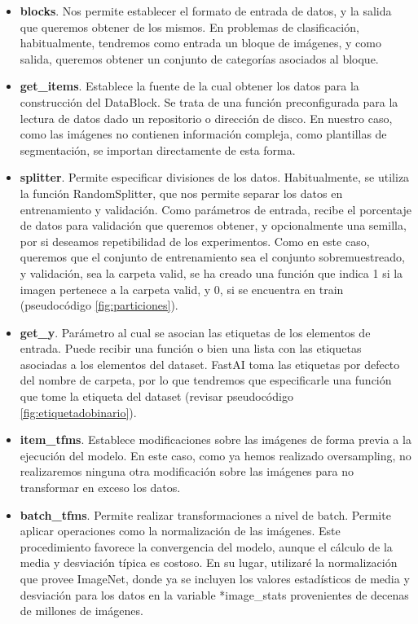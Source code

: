 \begin{itemize}
	\item \textbf{blocks}. Nos permite establecer el formato de entrada de datos, y la salida que queremos obtener de los mismos. En problemas de clasificación, habitualmente, tendremos como entrada un bloque de imágenes, y como salida, queremos obtener un conjunto de categorías asociados al bloque.
	\item \textbf{get\_items}. Establece la fuente de la cual obtener los datos para la construcción del DataBlock. Se trata de una función preconfigurada para la lectura de datos dado un repositorio o dirección de disco. En nuestro caso, como las imágenes no contienen información compleja, como plantillas de segmentación, se importan directamente de esta forma.
	\item \textbf{splitter}. Permite especificar divisiones de los datos. Habitualmente, se utiliza la función RandomSplitter, que nos permite separar los datos en entrenamiento y validación. Como parámetros de entrada, recibe el porcentaje de datos para validación que queremos obtener, y opcionalmente una semilla, por si deseamos repetibilidad de los experimentos. Como en este caso, queremos que el conjunto de entrenamiento sea el conjunto sobremuestreado, y validación, sea la carpeta valid, se ha creado una función que indica 1 si la imagen pertenece a la carpeta valid, y 0, si se encuentra en train (pseudocódigo \ref{fig:particiones}).
	\item \textbf{get\_y}. Parámetro al cual se asocian las etiquetas de los elementos de entrada. Puede recibir una función o bien una lista con las etiquetas asociadas a los elementos del dataset. FastAI toma las etiquetas por defecto del nombre de carpeta, por lo que tendremos que especificarle una función que tome la etiqueta del dataset (revisar pseudocódigo \ref{fig:etiquetadobinario}).
	\item \textbf{item\_tfms}. Establece modificaciones sobre las imágenes de forma previa a la ejecución del modelo. En este caso, como ya hemos realizado oversampling, no realizaremos ninguna otra modificación sobre las imágenes para no transformar en exceso los datos.
	\item \textbf{batch\_tfms}. Permite realizar transformaciones a nivel de batch. Permite aplicar operaciones como la normalización de las imágenes. Este procedimiento favorece la convergencia del modelo, aunque el cálculo de la media y desviación típica es costoso. En su lugar, utilizaré la normalización que provee ImageNet, donde ya se incluyen los valores estadísticos de media y desviación para los datos en la variable *image\_stats provenientes de decenas de millones de imágenes.
	
\end{itemize}


